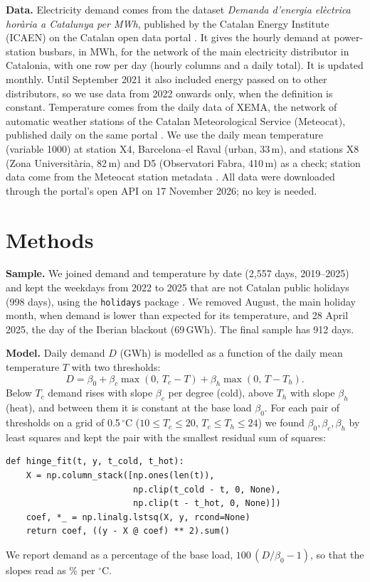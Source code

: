 \documentclass[
  journal=small,
  manuscript=mini-article,  %
  year=2026,
  volume=1,
]{odj-journal}
\begin{document}
\textbf{Data.} Electricity demand comes from the dataset \emph{Demanda d'energia el\`ectrica hor\`aria a Catalunya per MWh}, published by the Catalan Energy Institute (ICAEN) on the Catalan open data portal \cite{icaen_demand}. It gives the hourly demand at power-station busbars, in MWh, for the network of the main electricity distributor in Catalonia, with one row per day (hourly columns and a daily total). It is updated monthly. Until September 2021 it also included energy passed on to other distributors, so we use data from 2022 onwards only, when the definition is constant. Temperature comes from the daily data of XEMA, the network of automatic weather stations of the Catalan Meteorological Service (Meteocat), published daily on the same portal \cite{xema}. We use the daily mean temperature (variable 1000) at station X4, Barcelona--el Raval (urban, 33\,m), and stations X8 (Zona Universit\`aria, 82\,m) and D5 (Observatori Fabra, 410\,m) as a check; station data come from the Meteocat station metadata \cite{xema_meta}. All data were downloaded through the portal's open API on 17 November 2026; no key is needed.

\section{Methods}

\textbf{Sample.} We joined demand and temperature by date (2,557 days, 2019--2025) and kept the weekdays from 2022 to 2025 that are not Catalan public holidays (998 days), using the \texttt{holidays} package \cite{holidays}. We removed August, the main holiday month, when demand is lower than expected for its temperature, and 28 April 2025, the day of the Iberian blackout (69\,GWh). The final sample has 912 days.

\textbf{Model.} Daily demand $D$ (GWh) is modelled as a function of the daily mean temperature $T$ with two thresholds:
\begin{equation}
D = \beta_0 + \beta_c \max(0,\, T_c - T) + \beta_h \max(0,\, T - T_h).
\label{eq:model}
\end{equation}
Below $T_c$ demand rises with slope $\beta_c$ per degree (cold), above $T_h$ with slope $\beta_h$ (heat), and between them it is constant at the base load $\beta_0$. For each pair of thresholds on a grid of 0.5\,$^\circ$C ($10 \le T_c \le 20$, $T_c \le T_h \le 24$) we found $\beta_0, \beta_c, \beta_h$ by least squares and kept the pair with the smallest residual sum of squares:
\begin{lstlisting}
def hinge_fit(t, y, t_cold, t_hot):
    X = np.column_stack([np.ones(len(t)),
                         np.clip(t_cold - t, 0, None),
                         np.clip(t - t_hot, 0, None)])
    coef, *_ = np.linalg.lstsq(X, y, rcond=None)
    return coef, ((y - X @ coef) ** 2).sum()
\end{lstlisting}
We report demand as a percentage of the base load, $100\,(D/\beta_0 - 1)$, so that the slopes read as \% per $^\circ$C.
\end{document}
